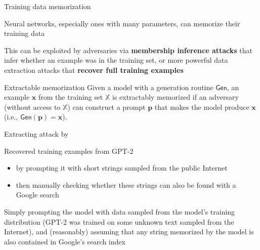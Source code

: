 \documentclass[12pt,aspectratio=169,handout]{beamer}
\begin{document}
\begin{frame}{Training data memorization}

Neural networks, especially ones with many parameters, can memorize their training data


This can be exploited by adversaries via \textbf{membership inference attacks} that infer whether an example was in the training set, or more powerful data extraction attacks that \textbf{recover full training examples}

\begin{block}{Extractable memorization}
Given a model with a generation routine $\mathsf{Gen}$, an example $\mathbf{x}$ from the training set $\mathbb{X}$ is extractably memorized if an adversary (without access to $\mathbb{X}$) can construct a prompt $\mathbf{p}$ that makes the model produce $\mathbf{x}$ (i.e., $\mathsf{Gen}(\mathbf{p}) = \mathbf{x}$).
\end{block}


\end{frame}


\begin{frame}{Extracting attack by \citet{Carlini.et.al.2020.arXiv}}

Recovered training examples from GPT-2
\begin{itemize}
\item by prompting it with short strings sampled from the public Internet
\item then manually checking whether these strings can also be found with a Google search
\end{itemize}

Simply prompting the model with data sampled from the model’s training distribution (GPT-2 was trained on some unknown text sampled from the Internet), and (reasonably) assuming that any string memorized by the model is also contained in Google’s search index


\end{frame}
\end{document}
